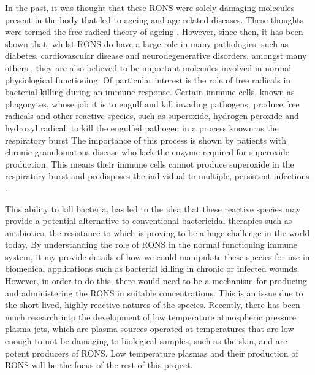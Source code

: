 \documentclass[11pt, oneside]{article}   	%
\begin{document}
In the past, it was thought that these RONS were solely damaging molecules present in the body that led to ageing and age-related diseases.
These thoughts were termed the free radical theory of ageing \cite{Harman1955}. 
However, since then, it has been shown that, whilst RONS do have a large role in many pathologies, such as diabetes, cardiovascular disease and neurodegenerative disorders, amongst many others \cite{Valko2007}, they are also believed to be important molecules involved in normal physiological functioning.
Of particular interest is the role of free radicals in bacterial killing during an immune response.
Certain immune cells, known as phagocytes, whose job it is to engulf and kill invading pathogens, produce free radicals and other reactive species, such as superoxide, hydrogen peroxide and hydroxyl radical, to kill the engulfed pathogen in a process known as the respiratory burst \cite{Janeway2011}
The importance of this process is shown by patients with chronic granulomatous disease who lack the enzyme required for superoxide production. This means their immune cells cannot produce superoxide in the respiratory burst and predisposes the individual to multiple, persistent infections \cite{Janeway2011, Babior2004}.


This ability to kill bacteria, has led to the idea that these reactive species may provide a potential alternative to conventional bactericidal therapies such as antibiotics, the resistance to which is proving to be a huge challenge in the world today. 
By understanding the role of RONS in the normal functioning immune system, it my provide details of how we could manipulate these species for use in biomedical applications such as bacterial killing in chronic or infected wounds.
However, in order to do this, there would need to be a mechanism for producing and administering the RONS in suitable concentrations.
This is an issue due to the short lived, highly reactive natures of the species.
Recently, there has been much research into the development of low temperature atmospheric pressure plasma jets, which are plasma sources operated at temperatures that are low enough to not be damaging to biological samples, such as the skin, and are potent producers of RONS. 
Low temperature plasmas and their production of RONS will be the focus of the rest of this project.


\end{document}
